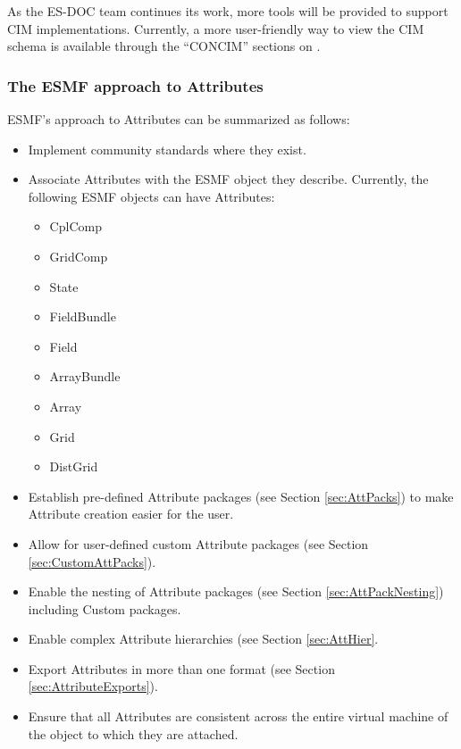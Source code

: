 As the ES-DOC team continues its work, more tools will be provided to support
CIM implementations.  Currently, a more user-friendly way to view the CIM
schema is available through the ``CONCIM'' sections on .


\subsubsection{The ESMF approach to Attributes}

ESMF's approach to Attributes can be summarized as follows:

\begin{itemize}
  \item Implement community standards where they exist.
  \item Associate Attributes with the ESMF object they describe. Currently, the following ESMF objects can have Attributes:
  \begin{itemize}
     \item CplComp
     \item GridComp
     \item State
     \item FieldBundle
     \item Field
     \item ArrayBundle
     \item Array
     \item Grid
     \item DistGrid
     \end{itemize}
  \item Establish pre-defined Attribute packages (see Section \ref{sec:AttPacks}) to make Attribute creation easier for the user.
  \item Allow for user-defined custom Attribute packages (see Section \ref{sec:CustomAttPacks}).
  \item Enable the nesting of Attribute packages (see Section \ref{sec:AttPackNesting}) including Custom packages.
  \item Enable complex Attribute hierarchies (see Section \ref{sec:AttHier}.
  \item Export Attributes in more than one format (see Section \ref{sec:AttributeExports}).
  \item Ensure that all Attributes are consistent across the entire virtual machine of the object to which they are attached.
\end{itemize}

